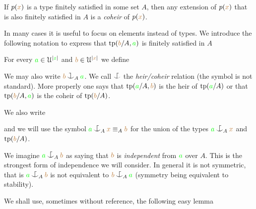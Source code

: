 \documentclass[creche.tex]{subfiles}
\begin{document}
If $p({\color{brown} x})$ is a type finitely satisfied in some set $A$, then any extension of $p({\color{brown} x})$ that is also finitely satisfied in $A$ is a \emph{coheir\/} of $p({\color{brown} x})$.

In many cases it is useful to focus on elements instead of types.
We introduce the following notation to express that ${\rm tp}({\color{brown} b}/A,{\color{green} a})$ is finitely satisfied in $A$

\begin{definition}\label{def_coheir_idepencence} For every ${\color{green} a}\in\EuScript U^{|{\color{green} z}|}$ and ${\color{brown} b}\in\EuScript U^{|{\color{brown} x}|}$ we define

\noindent\llap{\textcolor{red}{\Large\danger}\kern1.5ex}%


We may also write \emph{${\mr b}\cnonfork_A{\gr a}$}. 
We call $\nonforkc$ the \emph{heir/coheir} relation (the symbol is not standard).
More properly one says that ${\rm tp}({\color{green} a}/A,{\color{brown} b})$ is the heir of ${\rm tp}({\color{green} a}/A)$ or that ${\rm tp}({\color{brown} b}/A,{\color{green} a})$ is the coheir of ${\rm tp}({\color{brown} b}/A)$.

We also write


and we will use the symbol \emph{${\gr a}\nonforkc_A{\mr x}\equiv_A{\mr b}$} 
for the union of the types ${\gr a}\nonforkc_A{\mr x}$ and ${\rm tp}({\color{brown} b}/A)$.\QED
\end{definition}


We imagine ${\gr a}\nonforkc_A{\mr b}$ as saying that 
${\color{brown} b}$ is \emph{independent\/} from ${\color{green} a}$ over $A$.
%
This is the strongest form of independence we will consider.
%
In general it is not symmetric, that is ${\gr a}\nonforkc_A{\mr b}$ is not 
equivalent to ${\mr b}\nonforkc_A{\gr a}$ 
(symmetry being equivalent to stability).

We shall use, sometimes without reference, the following easy lemma
\end{document}
